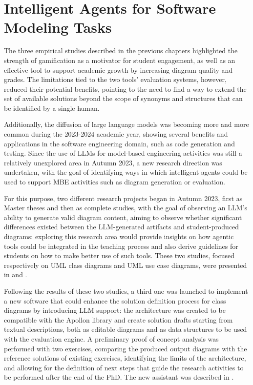 \chapter{Intelligent Agents for Software Modeling Tasks}
\label{ch6}
\graphicspath{{Chapter6/}}


The three empirical studies described in the previous chapters highlighted the strength of gamification as a motivator for student engagement, as well as an effective tool to support academic growth by increasing diagram quality and grades. The limitations tied to the two tools' evaluation systems, however, reduced their potential benefits, pointing to the need to find a way to extend the set of available solutions beyond the scope of synonyms and structures that can be identified by a single human. 

Additionally, the diffusion of large language models was becoming more and more common during the 2023-2024 academic year, showing several benefits and applications in the software engineering domain, such as code generation and testing. Since the use of LLMs for model-based engineering activities was still a relatively unexplored area in Autumn 2023, a new research direction was undertaken, with the goal of identifying ways in which intelligent agents could be used to support MBE activities such as diagram generation or evaluation.

For this purpose, two different research projects began in Autumn 2023, first as Master theses and then as complete studies, with the goal of observing an LLM's ability to generate valid diagram content, aiming to observe whether significant differences existed between the LLM-generated artifacts and student-produced diagrams: exploring this research area would provide insights on how agentic tools could be integrated in the teaching process and also derive guidelines for students on how to make better use of such tools. These two studies, focused respectively on UML class diagrams and UML use case diagrams, were presented in \cite{debari2024evaluating} and \cite{garaccione2025vega}.

Following the results of these two studies, a third one was launched to implement a new software that could enhance the solution definition process for class diagrams by introducing LLM support: the architecture was created to be compatible with the Apollon library and create solution drafts starting from textual descriptions, both as editable diagrams and as data structures to be used with the evaluation engine. A preliminary proof of concept analysis was performed with two exercises, comparing the produced output diagrams with the reference solutions of existing exercises, identifying the limits of the architecture, and allowing for the definition of next steps that guide the research activities to be performed after the end of the PhD. The new assistant was described in \cite{garaccione2026automated}.

